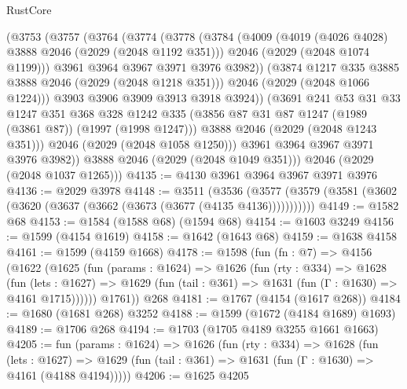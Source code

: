 \begin{lexlean}{RustCore}
\begin{coremodule}
            (@3753
              (@3757
                (@3764
                  (@3774
                    (@3778
                      (@3784
                        (@4009
                          (@4019 (@4026 @4028) @3888 @2046 (@2029 (@2048 @1192 @351)))
                          @2046
                          (@2029 (@2048 @1074 @1199)))
                        @3961
                        @3964
                        @3967
                        @3971
                        @3976
                        @3982))
                    (@3874 @1217 @335 @3885 @3888 @2046 (@2029 (@2048 @1218 @351)))
                    @2046
                    (@2029 (@2048 @1066 @1224)))
                  @3903
                  @3906
                  @3909
                  @3913
                  @3918
                  @3924))
              (@3691
                @241
                @53
                @31
                @33
                @1247
                @351
                @368
                @328
                @1242
                @335
                (@3856 @87 @31 @87 @1247 (@1989 (@3861 @87)) (@1997 (@1998 @1247)))
                @3888
                @2046
                (@2029 (@2048 @1243 @351)))
              @2046
              (@2029 (@2048 @1058 @1250)))
            @3961
            @3964
            @3967
            @3971
            @3976
            @3982))
        @3888
        @2046
        (@2029 (@2048 @1049 @351)))
      @2046
      (@2029 (@2048 @1037 @1265)))
@4135 := @4130 @3961 @3964 @3967 @3971 @3976
@4136 := @2029 @3978
@4148 := @3511
    (@3536 (@3577 (@3579 (@3581 (@3602 (@3620 (@3637 (@3662 (@3673 (@3677 (@4135 @4136)))))))))))
@4149 := @1582 @68
@4153 := @1584 (@1588 @68) (@1594 @68)
@4154 := @1603 @3249
@4156 := @1599 (@4154 @1619)
@4158 := @1642 (@1643 @68)
@4159 := @1638 @4158
@4161 := @1599 (@4159 @1668)
@4178 := @1598
    (fun (fn : @7) =>
    @4156
      (@1622
        (@1625
          (fun (params : @1624) =>
          @1626
            (fun (rty : @334) =>
            @1628
              (fun (lets : @1627) =>
              @1629 (fun (tail : @361) => @1631 (fun (Γ : @1630) => @4161 @1715))))))
        @1761))
    @268
@4181 := @1767 (@4154 (@1617 @268))
@4184 := @1680 (@1681 @268) @3252
@4188 := @1599 (@1672 (@4184 @1689) @1693)
@4189 := @1706 @268
@4194 := @1703 (@1705 @4189 @3255 @1661 @1663)
@4205 := fun (params : @1624) =>
  @1626
    (fun (rty : @334) =>
    @1628
      (fun (lets : @1627) =>
      @1629 (fun (tail : @361) => @1631 (fun (Γ : @1630) => @4161 (@4188 @4194)))))
@4206 := @1625 @4205

\end{coremodule}
\end{lexlean}
